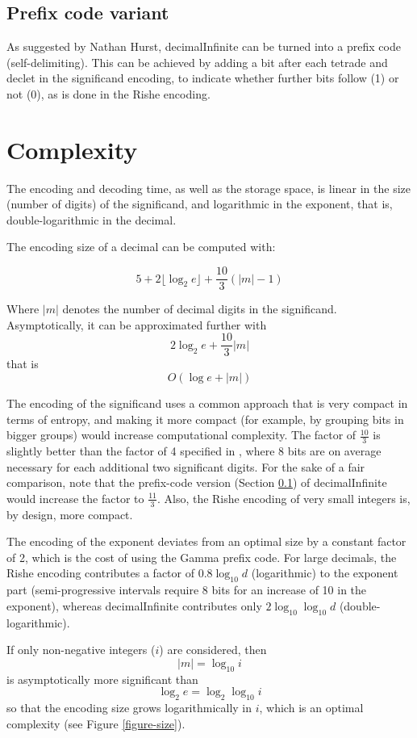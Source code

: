 \documentclass{acm_proc_article-sp}
\begin{document}
\subsection{Prefix code variant}
\label{section-prefix-code}

As suggested by Nathan Hurst, decimalInfinite can be turned into a prefix code (self-delimiting). This can be achieved by adding a bit after each tetrade and declet in the significand encoding, to indicate whether further bits follow (1) or not (0), as is done in the Rishe encoding.

\section{Complexity}
\label{section-complexity}
The encoding and decoding time, as well as the storage space, is linear in the size (number of digits) of the significand, and logarithmic in the exponent, that is, double-logarithmic in the decimal.

The encoding size of a decimal can be computed with:

$$5 + 2 \lfloor\log_2 e\rfloor + \frac{10}{3} (|m|-1)$$

Where $|m|$ denotes the number of decimal digits in the significand. Asymptotically, it can be approximated further with $$2 \log_2 e + \frac{10}{3}|m|$$ that is $$O(\log e + |m|)$$

The encoding of the significand uses a common approach that is very compact in terms of entropy, and making it more compact (for example, by grouping bits in bigger groups) would increase computational complexity. The factor of $\frac{10}{3}$ is slightly better than the factor of 4 specified in \cite{Rishe1992}, where 8 bits are on average necessary for each additional two significant digits. For the sake of a fair comparison, note that the prefix-code version (Section \ref{section-prefix-code}) of decimalInfinite would increase the factor to $\frac{11}{3}$. Also, the Rishe encoding of very small integers is, by design, more compact.

The encoding of the exponent deviates from an optimal size by a constant factor of 2, which is the cost of using the Gamma prefix code. For large decimals, the Rishe encoding contributes a factor of $0.8 \log_{10} d$ (logarithmic) to the exponent part (semi-progressive intervals require 8 bits for an increase of 10 in the exponent), whereas decimalInfinite contributes only $2 \log_{10}\log_{10} d$ (double-logari\-thmic).

If only non-negative integers ($i$) are considered, then $$|m|= \log_{10} i$$ is asymptotically more significant than $$\log_2 e=\log_2\log_{10} i$$ so that the encoding size grows logarithmically in $i$, which is an optimal complexity (see Figure \ref{figure-size}).
\end{document}
